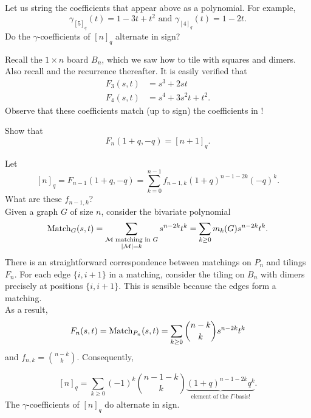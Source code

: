 	Let us string the coefficients that appear above as a polynomial. For example,
	\begin{equation}
		\label{eqn: gamma example}
		\gamma_{[5]_q}(t) = 1-3t+t^2 \text{ and } \gamma_{[4]_q}(t) = 1-2t.
	\end{equation}
	Do the $\gamma$-coefficients of $[n]_q$ alternate in sign?

	Recall the $1 \times n$ board $B_n$, which we saw how to tile with squares and dimers. Also recall  and the recurrence thereafter. It is easily verified that
	\begin{align*}
		F_3(s,t) &= s^3 + 2st \\
		F_4(s,t) &= s^4 + 3s^2t + t^2.
	\end{align*}
	Observe that these coefficients match (up to sign) the coefficients in !

	\begin{exercise}
		Show that
		\[ F_n(1+q,-q) = [n+1]_q. \]
	\end{exercise}

	Let
	\[ [n]_q = F_{n-1}(1+q,-q) = \sum_{k = 0}^{n-1} f_{n-1,k} (1+q)^{n-1-2k}(-q)^k. \]
	What are these $f_{n-1,k}$?\\

	Given a graph $G$ of size $n$, consider the bivariate polynomial
	\[ \operatorname{Match}_G(s,t) = \sum_{\substack{\text{$\mathcal{M}$ matching in $G$} \\ |\mathcal{M}| = k}} s^{n-2k} t^k = \sum_{k \ge 0} m_k(G) s^{n-2k} t^k . \]
	There is an straightforward correspondence between matchings on $P_n$ and tilings $F_n$. For each edge $\{i,i+1\}$ in a matching, consider the tiling on $B_n$ with dimers precisely at positions $\{i,i+1\}$. This is sensible because the edges form a matching.\\
	As a result,
	\[ F_n(s,t) = \operatorname{Match}_{P_n}(s,t) = \sum_{k \ge 0} \binom{n-k}{k} s^{n-2k} t^k \]
	and $f_{n,k} = \binom{n-k}{k}$. Consequently,

	\[ [n]_q = \sum_{k \ge 0} (-1)^k \binom{n-1-k}{k} \underbrace{(1+q)^{n-1-2k} q^k}_{\text{element of the $\Gamma$-basis!}}. \]
	The $\gamma$-coefficients of $[n]_q$ do alternate in sign.
